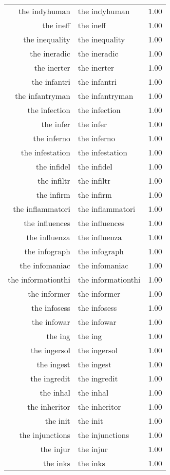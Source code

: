 \begin{table}[ht]
\begin{tabular}{rlr}
  the indyhuman & the indyhuman & 1.00 \\ 
  the ineff & the ineff & 1.00 \\ 
  the inequality & the inequality & 1.00 \\ 
  the ineradic & the ineradic & 1.00 \\ 
  the inerter & the inerter & 1.00 \\ 
  the infantri & the infantri & 1.00 \\ 
  the infantryman & the infantryman & 1.00 \\ 
  the infection & the infection & 1.00 \\ 
  the infer & the infer & 1.00 \\ 
  the inferno & the inferno & 1.00 \\ 
  the infestation & the infestation & 1.00 \\ 
  the infidel & the infidel & 1.00 \\ 
  the infiltr & the infiltr & 1.00 \\ 
  the infirm & the infirm & 1.00 \\ 
  the inflammatori & the inflammatori & 1.00 \\ 
  the influences & the influences & 1.00 \\ 
  the influenza & the influenza & 1.00 \\ 
  the infograph & the infograph & 1.00 \\ 
  the infomaniac & the infomaniac & 1.00 \\ 
  the informationthi & the informationthi & 1.00 \\ 
  the informer & the informer & 1.00 \\ 
  the infosess & the infosess & 1.00 \\ 
  the infowar & the infowar & 1.00 \\ 
  the ing & the ing & 1.00 \\ 
  the ingersol & the ingersol & 1.00 \\ 
  the ingest & the ingest & 1.00 \\ 
  the ingredit & the ingredit & 1.00 \\ 
  the inhal & the inhal & 1.00 \\ 
  the inheritor & the inheritor & 1.00 \\ 
  the init & the init & 1.00 \\ 
  the injunctions & the injunctions & 1.00 \\ 
  the injur & the injur & 1.00 \\ 
  the inks & the inks & 1.00 \\ 

\end{tabular}
\end{table}
